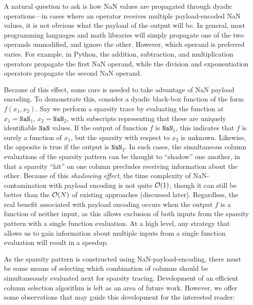 A natural question to ask is how NaN values are propagated through dyadic operations—in cases where an operator receives multiple payload-encoded NaN values, it is not obvious what the payload of the output will be. In general, most programming languages and math libraries will simply propagate one of the two operands unmodified, and ignore the other. However, which operand is preferred varies. For example, in Python, the addition, subtraction, and multiplication operators propagate the first NaN operand, while the division and exponentiation operators propagate the second NaN operand.

Because of this effect, some care is needed to take advantage of NaN payload encoding. To demonstrate this, consider a dyadic black-box function of the form $f(x_1, x_2)$. Say we perform a sparsity trace by evaluating the function at $x_1=\texttt{NaN}_1$, $x_2=\texttt{NaN}_2$, with subscripts representing that these are uniquely identifiable $\texttt{NaN}$ values. If the output of function $f$ is $\texttt{NaN}_1$, this indicates that $f$ is surely a function of $x_1$, but the sparsity with respect to $x_2$ is unknown. Likewise, the opposite is true if the output is $\texttt{NaN}_2$. In such cases, the simultaneous column evaluations of the sparsity pattern can be thought to ``shadow'' one another, in that a sparsity ``hit'' on one column precludes receiving information about the other. Because of this \emph{shadowing effect}, the time complexity of NaN-contamination with payload encoding is not quite $\mathcal{O}(1)$, though it can still be better than the $\mathcal{O}(N)$ of existing approaches (discussed later). Regardless, the real benefit associated with payload encoding occurs when the output $f$ is a function of neither input, as this allows exclusion of both inputs from the sparsity pattern with a single function evaluation. At a high level, any strategy that allows us to gain information about multiple inputs from a single function evaluation will result in a speedup.

As the sparsity pattern is constructed using NaN-payload-encoding, there must be some means of selecting which combination of columns should be simultaneously evaluated next for sparsity tracing. Development of an efficient column selection algorithm is left as an area of future work. However, we offer some observations that may guide this development for the interested reader:

